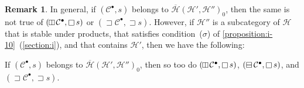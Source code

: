 \documentclass[a4paper,fleqn]{article}
\theoremstyle{plain}
\newenvironment{theorem}[1]
  {\renewcommand\theinnertheorem{#1}\innertheorem}
  {\endinnertheorem}
\theoremstyle{definition}
\newtheorem*{remark}{Remark}
\newcommand{\CC}{\mathcal{C}}
\newcommand{\HH}{\mathcal{H}}
\newcommand{\hsqbox}{{\boxminus}}
\newcommand{\vsqbox}{{\rotatebox{90}{$\boxminus$}}}
\DeclareMathOperator{\sq}{\square}
\DeclareMathOperator{\hsq}{\raisebox{-.05em}{$\hsqbox$}}
\DeclareMathOperator{\vsq}{\raisebox{-.1em}{$\vsqbox$}}
\DeclareMathOperator{\trio}{\sqsupset}
\begin{document}
\begin{remark}
  In general, if $(\CC^\bullet,s)$ belongs to $\overline{\HH}(\HH',\HH'')_0$, then the same is not true of $(\vsq\CC^\bullet,\sq s)$ or $(\trio\CC^\bullet,\trio s)$.
  However, if $\HH''$ is a subcategory of $\HH$ that is stable under products, that satisfies condition~($\sigma$) of \cref{proposition:i-10}~(\cref{section:i}), and that contains $\HH'$, then we have the following:
\end{remark}

\begin{theorem}{18}
\label{theorem:ii-18}
  If $(\CC^\bullet,s)$ belongs to $\overline{\HH}(\HH',\HH'')_0$, then so too do $(\vsq\CC^\bullet,\sq s)$, $(\hsq\CC^\bullet,\sq s)$, and $(\trio\CC^\bullet,\trio s)$.
\end{theorem}
\end{document}
